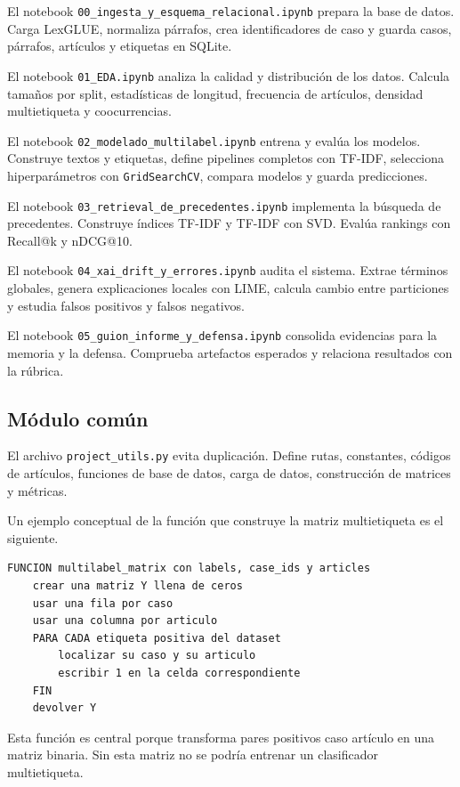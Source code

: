 \documentclass[11pt,a4paper]{article}
\begin{document}
El notebook \texttt{00\_ingesta\_y\_esquema\_relacional.ipynb} prepara la base de datos. Carga LexGLUE, normaliza párrafos, crea identificadores de caso y guarda casos, párrafos, artículos y etiquetas en SQLite.

El notebook \texttt{01\_EDA.ipynb} analiza la calidad y distribución de los datos. Calcula tamaños por split, estadísticas de longitud, frecuencia de artículos, densidad multietiqueta y coocurrencias.

El notebook \texttt{02\_modelado\_multilabel.ipynb} entrena y evalúa los modelos. Construye textos y etiquetas, define pipelines completos con TF-IDF, selecciona hiperparámetros con \texttt{GridSearchCV}, compara modelos y guarda predicciones.

El notebook \texttt{03\_retrieval\_de\_precedentes.ipynb} implementa la búsqueda de precedentes. Construye índices TF-IDF y TF-IDF con SVD. Evalúa rankings con Recall@k y nDCG@10.

El notebook \texttt{04\_xai\_drift\_y\_errores.ipynb} audita el sistema. Extrae términos globales, genera explicaciones locales con LIME, calcula cambio entre particiones y estudia falsos positivos y falsos negativos.

El notebook \texttt{05\_guion\_informe\_y\_defensa.ipynb} consolida evidencias para la memoria y la defensa. Comprueba artefactos esperados y relaciona resultados con la rúbrica.

\subsection{Módulo común}

El archivo \texttt{project\_utils.py} evita duplicación. Define rutas, constantes, códigos de artículos, funciones de base de datos, carga de datos, construcción de matrices y métricas.

Un ejemplo conceptual de la función que construye la matriz multietiqueta es el siguiente.

\begin{lstlisting}
FUNCION multilabel_matrix con labels, case_ids y articles
    crear una matriz Y llena de ceros
    usar una fila por caso
    usar una columna por articulo
    PARA CADA etiqueta positiva del dataset
        localizar su caso y su articulo
        escribir 1 en la celda correspondiente
    FIN
    devolver Y
\end{lstlisting}

Esta función es central porque transforma pares positivos caso artículo en una matriz binaria. Sin esta matriz no se podría entrenar un clasificador multietiqueta.
\end{document}
